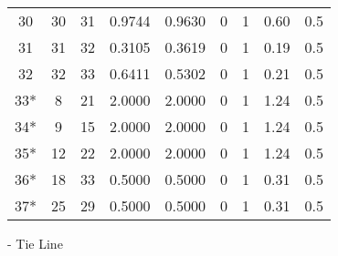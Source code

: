 \begin{longtable}{ccccccccc}
		30 & 30 & 31 & 0.9744 & 0.9630 & 0 & 1 & 0.60 & 0.5 \\
		31 & 31 & 32 & 0.3105 & 0.3619 & 0 & 1 & 0.19 & 0.5 \\
		32 & 32 & 33 & 0.6411 & 0.5302 & 0 & 1 & 0.21 & 0.5 \\
		 33* & 8 & 21 & 2.0000 & 2.0000 & 0 & 1 & 1.24 & 0.5 \\
	    	34* & 9 & 15 & 2.0000 & 2.0000 & 0 & 1 & 1.24 & 0.5 \\
		 35* & 12 & 22 & 2.0000 & 2.0000 & 0 & 1 & 1.24 & 0.5 \\
		 36* & 18 & 33 & 0.5000 & 0.5000 & 0 & 1 & 0.31 & 0.5 \\
		 37* & 25 & 29 & 0.5000 & 0.5000 & 0 & 1 & 0.31 & 0.5\\
		 \bottomrule
	\end{longtable}
\begin{flushleft}
	\newline *- Tie Line 
	\end{flushleft}	

